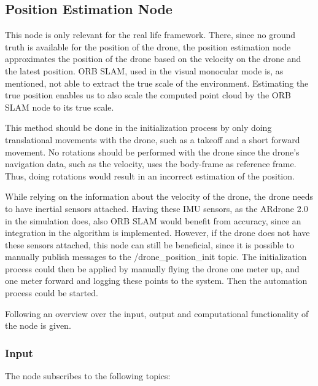 	
	\subsection{Position Estimation Node}
	
	This node is only relevant for the real life framework. There, since no ground truth is available for the position of the drone, 
	the position estimation node approximates the position of the drone based on the velocity on the drone and the latest position. ORB SLAM, used 
	in the visual monocular mode is, as mentioned, not able to extract the true scale of the environment. Estimating the true position enables us 
	to also scale the computed point cloud by the ORB SLAM node to its true scale. 
	
	This method should be done in the initialization process by 
	only doing translational movements with the drone, such as a takeoff and a short forward movement. No rotations should be performed with the drone 
	since the drone's navigation data, such as the velocity, uses the body-frame as reference frame. Thus, doing rotations would result in an incorrect 
	estimation of the position. 
	
	While relying on the information about the 
	velocity of the drone, the drone needs to have inertial sensors attached. Having these IMU sensors, as the ARdrone 2.0 in the simulation does,
	also ORB SLAM would benefit from 
	accuracy, since an integration in the algorithm is implemented. However, if the drone does not have these sensors attached, 
	this node can still be beneficial, since it is possible to manually publish messages to the /drone\_position\_init topic. 
	The initialization process could then be applied 
	by manually flying the drone one meter up, and one meter forward and logging these points to the system. Then the automation process could be started.
	
	
	Following an overview over the input, output and computational functionality of the node is given. 
	
	\subsubsection{Input}
	
	The node subscribes to the following topics:
	
